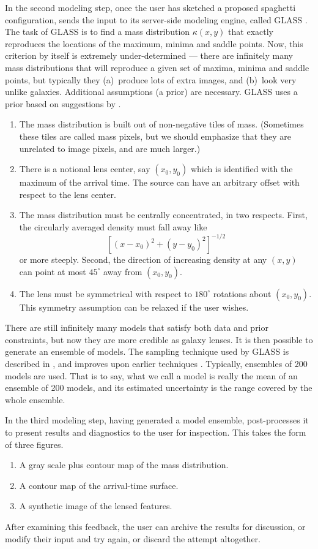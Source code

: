 In the second modeling step, once the user has sketched a proposed
spaghetti configuration, \spl sends the input to its server-side
modeling engine, called GLASS \citep{2014arXiv1401.7990C}.  The task
of GLASS is to find a mass distribution $\kappa(x,y)$ that exactly
reproduces the locations of the maximum, minima and saddle
points. Now, this criterion by itself is extremely under-determined
--- there are infinitely many mass distributions that will reproduce a
given set of maxima, minima and saddle points, but typically they
(a)~produce lots of extra images, and (b)~look very unlike galaxies.
Additional assumptions (a prior) are necessary.  GLASS uses a prior
based on suggestions by \cite{1997MNRAS.292..148S}.
\begin{enumerate}
\item The mass distribution is built out of non-negative tiles of
  mass.  (Sometimes these tiles are called mass pixels, but we should
  emphasize that they are unrelated to image pixels, and are much
  larger.)
\item There is a notional lens center, say $(x_0,y_0)$ which is
  identified with the maximum of the arrival time.  The source can
  have an arbitrary offset with respect to the lens center.
\item The mass distribution must be centrally concentrated, in two
  respects.  First, the circularly averaged density must fall away
  like $$ \left[(x-x_0)^2+(y-y_0)^2\right]^{-1/2}$$ or more steeply.
  Second, the direction of increasing density at any $(x,y)$ can point
  at most $45^\circ$ away from $(x_0,y_0)$.
\item The lens must be symmetrical with respect to $180^\circ$ rotations
  about $(x_0,y_0)$.  This symmetry assumption can be relaxed if the
  user wishes.
\end{enumerate}
There are still infinitely many models that satisfy both data and
prior constraints, but now they are more credible as galaxy lenses.
It is then possible to generate an ensemble of models.  The sampling
technique used by GLASS is described in \citep{Lubini2012}, and
improves upon earlier techniques \citep{2000AJ....119..439W,Saha2004}.
Typically, ensembles of 200 models are used.  That is to say, what we
call a \spl model is really the mean of an ensemble of 200 models, and
its estimated uncertainty is the range covered by the whole ensemble.

In the third modeling step, having generated a model ensemble, \spl
post-processes it to present results and diagnostics to the user for
inspection. This takes the form of three figures.
\begin{enumerate}
\item A gray scale plus contour map of the mass distribution.
\item A contour map of the arrival-time surface.
\item A synthetic image of the lensed features.
\end{enumerate}
After examining this feedback, the user can archive the results for
discussion, or modify their input and try again, or discard the
attempt altogether.

